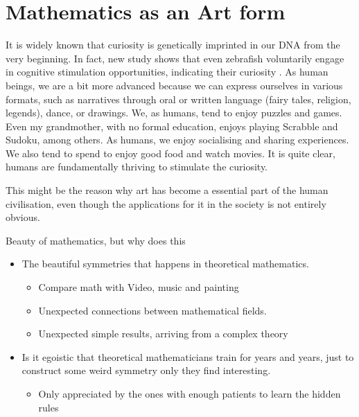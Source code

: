 \documentclass[10pt,conference]{IEEEtran}
\begin{document}
\begin{sloppy}
\begin{itemize}
\end{itemize}


\newpage
\section{Mathematics as an Art form}%
\label{sec:mathematics_for_stimulating_intellectual_mind}


It is widely known that curiosity is genetically imprinted in our DNA from the very beginning.
In fact, new study shows that even zebrafish voluntarily engage in cognitive stimulation opportunities, indicating their curiosity \cite{franks2023curiosity}.
As human beings, we are a bit more advanced because we can express ourselves in various formats, such as narratives through oral or written language (fairy tales, religion, legends), dance, or drawings. We, as humans, tend to enjoy puzzles and games.
Even my grandmother, with no formal education, enjoys playing Scrabble and Sudoku, among others.
As humans, we enjoy socialising and sharing experiences. We also tend to spend to enjoy good food and watch movies. It is quite clear, humans are fundamentally thriving to stimulate the curiosity.

This might be the reason why art has become a essential part of the human civilisation, even though the applications for it in the society is not entirely obvious.




Beauty of mathematics, but why does this
\begin{itemize}
    \item The beautiful symmetries that happens in theoretical mathematics.
        \begin{itemize}
            \item Compare math with Video, music and painting
            \item Unexpected connections between mathematical fields.
            \item Unexpected simple results, arriving from a complex theory
        \end{itemize}
    \item Is it egoistic that theoretical mathematicians train for years and years, just to construct some weird symmetry only they find interesting.
        \begin{itemize}
            \item Only appreciated by the ones with enough patients to learn the hidden rules
        \end{itemize}
\end{itemize}

\newpage






    \printbibliography
\end{sloppy}
\end{document}
